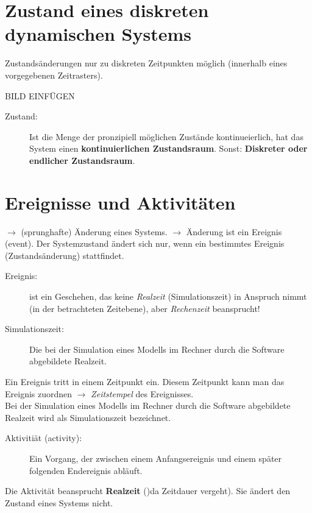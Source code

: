 \documentclass[11pt, a4paper]{article}
\begin{document}
\section{Zustand eines diskreten dynamischen Systems}

Zustandsänderungen nur zu diskreten Zeitpunkten möglich (innerhalb eines vorgegebenen Zeitrasters).

BILD EINFÜGEN

\begin{description}
        \item[Zustand:] Ist die Menge der pronzipiell möglichen Zustände kontinueierlich, hat das System einen \textbf{kontinuierlichen Zustandsraum}. Sonst: \textbf{Diskreter oder endlicher Zustandsraum}.
\end{description}

\section{Ereignisse und Aktivitäten}
$\rightarrow$ (sprunghafte) Änderung eines Systems. $\rightarrow$ Änderung ist ein Ereignis (event).
Der Systemzustand ändert sich nur, wenn ein bestimmtes Ereignis (Zustandsänderung) stattfindet.

\begin{description}
\item[Ereignis:] ist ein Geschehen, das keine \emph{Realzeit} (Simulationszeit) in Anspruch nimmt (in der betrachteten Zeitebene), aber \emph{Rechenzeit} beansprucht!
\item[Simulationszeit:] Die bei der Simulation eines Modells im Rechner durch die Software abgebildete Realzeit.
\end{description}

Ein Ereignis tritt in einem Zeitpunkt ein. Diesem Zeitpunkt kann man das Ereignis zuordnen $\rightarrow$ \emph{Zeitstempel} des Ereignisses.\\

Bei der Simulation eines Modells im Rechner durch die Software abgebildete Realzeit wird als Simulationszeit bezeichnet.

\begin{description}
\item[Aktivitiät (activity):] Ein Vorgang, der zwischen einem Anfangsereignis und einem später folgenden Endereignis abläuft.
\end{description}

Die Aktivität beansprucht \textbf{Realzeit} ()da Zeitdauer vergeht).
Sie ändert den Zustand eines Systems nicht.
\end{document}
